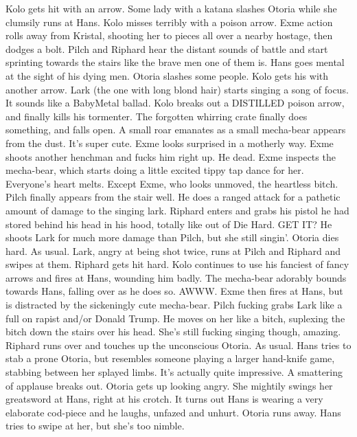 Kolo gets hit with an arrow.\medskip
Some lady with a katana slashes Otoria while she clumsily runs at Hans.\medskip
Kolo misses terribly with a poison arrow.\medskip
Exme action rolls away from Kristal, shooting her to pieces all over a nearby hostage, then dodges a bolt.\medskip
Pilch and Riphard hear the distant sounds of battle and start sprinting towards the stairs like the brave men one of them is.\medskip
Hans goes mental at the sight of his dying men.\medskip
Otoria slashes some people.\medskip
Kolo gets his with another arrow.\medskip
Lark (the one with long blond hair) starts singing a song of focus. It sounds like a BabyMetal ballad.\medskip
Kolo breaks out a DISTILLED poison arrow, and finally kills his tormenter.\medskip
The forgotten whirring crate finally does something, and falls open. A small roar emanates as a small mecha-bear appears from the dust. It’s super cute. Exme looks surprised in a motherly way.\medskip
Exme shoots another henchman and fucks him right up. He dead. Exme inspects the mecha-bear, which starts doing a little excited tippy tap dance for her. Everyone’s heart melts. Except Exme, who looks unmoved, the heartless bitch.\medskip
Pilch finally appears from the stair well. He does a ranged attack for a pathetic amount of damage to the singing lark.\medskip
Riphard enters and grabs his pistol he had stored behind his head in his hood, totally like out of Die Hard. GET IT? He shoots Lark for much more damage than Pilch, but she still singin’.\medskip
Otoria dies hard. As usual.\medskip
Lark, angry at being shot twice, runs at Pilch and Riphard and swipes at them. Riphard gets hit hard.\medskip
Kolo continues to use his fanciest of fancy arrows and fires at Hans, wounding him badly.\medskip
The mecha-bear adorably bounds towards Hans, falling over as he does so. AWWW.\medskip
Exme then fires at Hans, but is distracted by the sickeningly cute mecha-bear.\medskip
Pilch fucking grabs Lark like a full on rapist and/or Donald Trump. He moves on her like a bitch, suplexing the bitch down the stairs over his head. She’s still fucking singing though, amazing.\medskip
Riphard runs over and touches up the unconscious Otoria. As usual.\medskip
Hans tries to stab a prone Otoria, but resembles someone playing a larger hand-knife game, stabbing between her splayed limbs. It’s actually quite impressive. A smattering of applause breaks out.\medskip
Otoria gets up looking angry. She mightily swings her greatsword at Hans, right at his crotch. It turns out Hans is wearing a very elaborate cod-piece and he laughs, unfazed and unhurt. Otoria runs away. Hans tries to swipe at her, but she’s too nimble.\medskip
